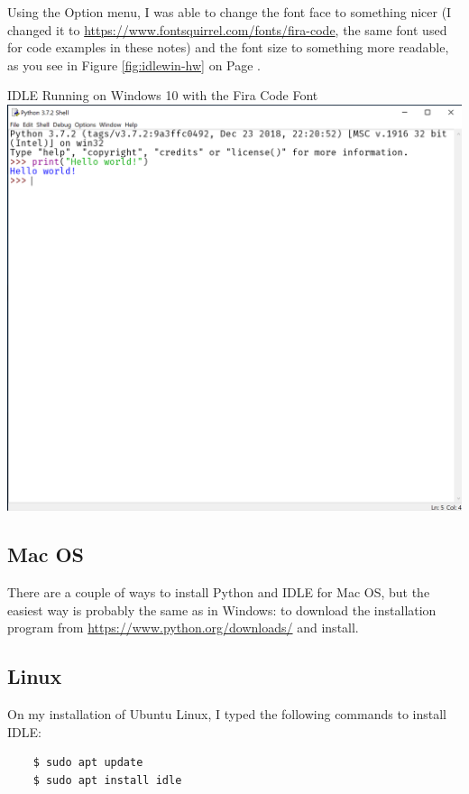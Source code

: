 Using the Option menu, I was able to change the font face to something nicer (I changed it to \href{Fira Code}{https://www.fontsquirrel.com/fonts/fira-code}, the same font used for code examples in these notes) and the font size to something more readable, as you see in Figure \ref{fig:idlewin-hw} on Page \pageref{fig:idlewin-hw}.

\begin{myfigure}[label=fig:idlewin-hw]{IDLE Running on Windows 10 with the Fira Code Font}
    \centering
    \includegraphics[scale=0.4]{screenshots/idlewin-hw}
\end{myfigure}

\subsection{Mac OS}

There are a couple of ways to install Python and IDLE for Mac OS, but the easiest way is probably the same as in Windows: to download the installation program from \url{https://www.python.org/downloads/} and install.

\subsection{Linux}

On my installation of Ubuntu Linux, I typed the following commands to install IDLE:

\begin{verbatim}
    $ sudo apt update
    $ sudo apt install idle
\end{verbatim}

